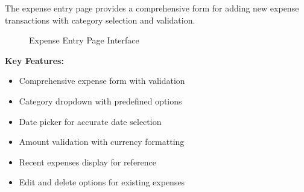 The expense entry page provides a comprehensive form for adding new expense transactions with category selection and validation.

\begin{figure}[h]
\centering
{}
\caption{Expense Entry Page Interface}
\label{fig:expense}
\end{figure}

\textbf{Key Features:}
\begin{itemize}
    \item Comprehensive expense form with validation
    \item Category dropdown with predefined options
    \item Date picker for accurate date selection
    \item Amount validation with currency formatting
    \item Recent expenses display for reference
    \item Edit and delete options for existing expenses
\end{itemize}

